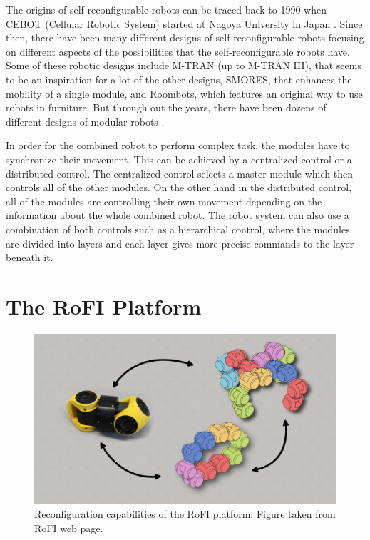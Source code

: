 \documentclass[
  digital, %
  table,   %
  oneside, %
  nolof,     %
  nolot,     %
]{fithesis3}
\begin{document}
The origins of self-reconfigurable robots can be traced back to 1990 when CEBOT (Cellular Robotic System) started at Nagoya University in Japan \cite{current-trends}.
Since then, there have been many different designs of self-reconfigurable robots focusing on different aspects of the possibilities that the self-reconfigurable robots have.
Some of these robotic designs include M-TRAN (up to M-TRAN III)\cite{mtran}, that seems to be an inspiration for a lot of the other designs, SMORES\cite{smores}, that enhances the mobility of a single module, and Roombots\cite{roombots}, which features an original way to use robots in furniture.
But through out the years, there have been dozens of different designs of modular robots \cite{current-trends}.

In order for the combined robot to perform complex task, the modules have to synchronize their movement.
This can be achieved by a centralized control or a distributed control.
The centralized control selects a master module which then controls all of the other modules.
On the other hand in the distributed control, all of the modules are controlling their own movement depending on the information about the whole combined robot.
The robot system can also use a combination of both controls such as a hierarchical control, where the modules are divided into layers and each layer gives more precise commands to the layer beneath it.


\chapter{The RoFI Platform}

\begin{figure}
    \centering
    \includegraphics[width=\linewidth]{data/rofi_transformation.jpg}
    \caption{Reconfiguration capabilities of the RoFI platform. Figure taken from RoFI web page\cite{rofi-web}.}
    \label{fig:rofi-transform}
\end{figure}
\end{document}
